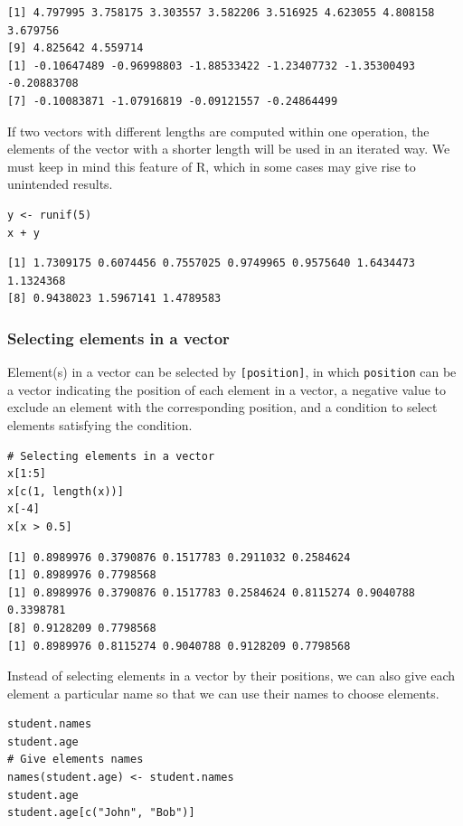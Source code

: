 \documentclass[a4paper,11pt]{article}
\begin{document}
\begin{verbatim}
[1] 4.797995 3.758175 3.303557 3.582206 3.516925 4.623055 4.808158 3.679756
[9] 4.825642 4.559714
[1] -0.10647489 -0.96998803 -1.88533422 -1.23407732 -1.35300493 -0.20883708
[7] -0.10083871 -1.07916819 -0.09121557 -0.24864499
\end{verbatim}

If two vectors with different lengths are computed within one
operation, the elements of the vector with a shorter length will be
used in an iterated way. We must keep in mind this feature of R, which
in some cases may give rise to unintended results.

\begin{verbatim}
y <- runif(5)
x + y
\end{verbatim}

\begin{verbatim}
[1] 1.7309175 0.6074456 0.7557025 0.9749965 0.9575640 1.6434473 1.1324368
[8] 0.9438023 1.5967141 1.4789583
\end{verbatim}

\subsubsection*{Selecting elements in a vector}
\label{sec:orgbc5fae4}

Element(s) in a vector can be selected by \texttt{[position]}, in which
\texttt{position} can be a vector indicating the position of each element in
a vector, a negative value to exclude an element with the
corresponding position, and a condition to select elements satisfying
the condition.

\begin{verbatim}
# Selecting elements in a vector
x[1:5]
x[c(1, length(x))]
x[-4]
x[x > 0.5]
\end{verbatim}

\begin{verbatim}
[1] 0.8989976 0.3790876 0.1517783 0.2911032 0.2584624
[1] 0.8989976 0.7798568
[1] 0.8989976 0.3790876 0.1517783 0.2584624 0.8115274 0.9040788 0.3398781
[8] 0.9128209 0.7798568
[1] 0.8989976 0.8115274 0.9040788 0.9128209 0.7798568
\end{verbatim}

Instead of selecting elements in a vector by their positions, we can
also give each element a particular name so that we can use their
names to choose elements.

\begin{verbatim}
student.names
student.age
# Give elements names
names(student.age) <- student.names
student.age
student.age[c("John", "Bob")]
\end{verbatim}
\end{document}
